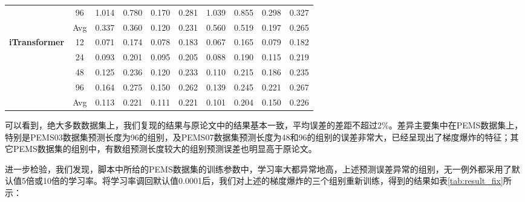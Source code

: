 \documentclass[twoside,12pt]{article}
\begin{document}
\begin{table}[htbp]
{\begin{small}
\begin{tabular}{c|c|cc|cc|cc|cc}
                                                                 & 96         & 1.014                       & 0.780                       & 0.170                       & 0.281                      & 1.039 & 0.855 & 0.298 & 0.327 \\
        \cmidrule(lr){2-10}
                                                                 & Avg        & 0.337                       & 0.360                       & 0.120                       & 0.231                      & 0.560 & 0.519 & 0.197 & 0.265 \\
        \midrule
        \multirow{5}{*}{\textbf{iTransformer}}                   & 12         & 0.071                       & 0.174                       & 0.078                       & 0.183                      & 0.067 & 0.165 & 0.079 & 0.182 \\
                                                                 & 24         & 0.093                       & 0.201                       & 0.095                       & 0.205                      & 0.088 & 0.190 & 0.115 & 0.219 \\
                                                                 & 48         & 0.125                       & 0.236                       & 0.120                       & 0.233                      & 0.110 & 0.215 & 0.186 & 0.235 \\
                                                                 & 96         & 0.164                       & 0.275                       & 0.150                       & 0.262                      & 0.139 & 0.245 & 0.221 & 0.267 \\
        \cmidrule(lr){2-10}
                                                                 & Avg        & 0.113                       & 0.221                       & 0.111                       & 0.221                      & 0.101 & 0.204 & 0.150 & 0.226 \\
        \bottomrule
      \end{tabular}
    \end{small}
  }
\end{table}

可以看到，绝大多数数据集上，我们复现的结果与原论文中的结果基本一致，平均误差的差距不超过2\%。差异主要集中在PEMS数据集上，特别是PEMS03数据集预测长度为96的组别，及PEMS07数据集预测长度为48和96的组别的误差非常大，已经呈现出了梯度爆炸的特征；其它PEMS数据集的组别中，有数组预测长度较大的组别预测误差也明显高于原论文。

进一步检验，我们发现，脚本中所给的PEMS数据集的训练参数中，学习率大都异常地高，上述预测误差异常的组别，无一例外都采用了默认值5倍或10倍的学习率。将学习率调回默认值0.0001后，我们对上述的梯度爆炸的三个组别重新训练，得到的结果如表\ref{tab:result_fix}所示：
\end{document}
